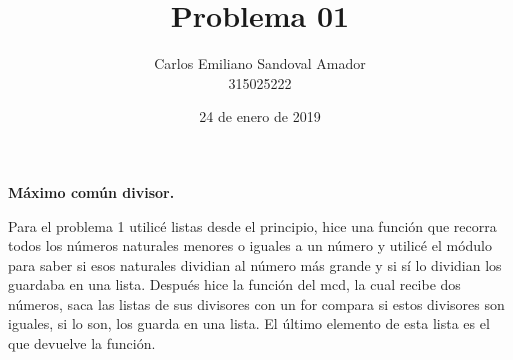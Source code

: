 \documentclass[letterpaper, 12pt, oneside]{article}%
\title{Problema 01}
\author{Carlos Emiliano Sandoval Amador \\ 315025222}
\date{24 de enero de 2019}
\begin{document}
	\maketitle
	\begin{center}
		\textbf{\large Máximo común divisor.}
	\end{center}
	Para el problema 1 utilicé listas desde el principio, hice una función que recorra todos los números naturales menores o iguales a un número y utilicé el módulo para saber si esos naturales dividian al número más grande y si sí lo dividian los guardaba en una lista. Después hice la función del mcd, la cual recibe dos números, saca las listas de sus divisores  con un for compara si estos divisores son iguales, si lo son, los guarda en una lista. El último elemento de esta lista es el que devuelve la función.
\end{document}
